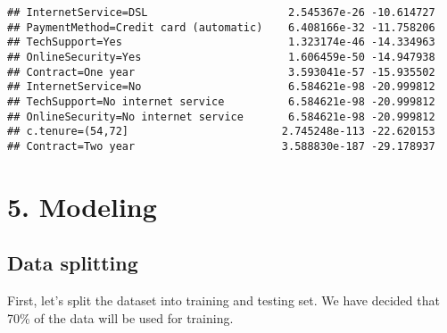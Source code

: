 \documentclass[
]{article}
\newenvironment{Shaded}{\begin{snugshade}}{\end{snugshade}}
\newcommand{\AttributeTok}[1]{\textcolor[rgb]{0.13,0.29,0.53}{#1}}
\newcommand{\CommentTok}[1]{\textcolor[rgb]{0.56,0.35,0.01}{\textit{#1}}}
\newcommand{\ConstantTok}[1]{\textcolor[rgb]{0.56,0.35,0.01}{#1}}
\newcommand{\DecValTok}[1]{\textcolor[rgb]{0.00,0.00,0.81}{#1}}
\newcommand{\FloatTok}[1]{\textcolor[rgb]{0.00,0.00,0.81}{#1}}
\newcommand{\FunctionTok}[1]{\textcolor[rgb]{0.13,0.29,0.53}{\textbf{#1}}}
\newcommand{\NormalTok}[1]{#1}
\newcommand{\OtherTok}[1]{\textcolor[rgb]{0.56,0.35,0.01}{#1}}
\newcommand{\SpecialCharTok}[1]{\textcolor[rgb]{0.81,0.36,0.00}{\textbf{#1}}}
\begin{document}
\begin{verbatim}
## InternetService=DSL                      2.545367e-26 -10.614727
## PaymentMethod=Credit card (automatic)    6.408166e-32 -11.758206
## TechSupport=Yes                          1.323174e-46 -14.334963
## OnlineSecurity=Yes                       1.606459e-50 -14.947938
## Contract=One year                        3.593041e-57 -15.935502
## InternetService=No                       6.584621e-98 -20.999812
## TechSupport=No internet service          6.584621e-98 -20.999812
## OnlineSecurity=No internet service       6.584621e-98 -20.999812
## c.tenure=(54,72]                        2.745248e-113 -22.620153
## Contract=Two year                       3.588830e-187 -29.178937
\end{verbatim}

\begin{Shaded}
\end{Shaded}

\hypertarget{modeling}{%
\section{5. Modeling}\label{modeling}}

\hypertarget{data-splitting}{%
\subsection{Data splitting}\label{data-splitting}}

First, let's split the dataset into training and testing set. We have
decided that 70\% of the data will be used for training.

\begin{Shaded}
\end{Shaded}
\end{document}
